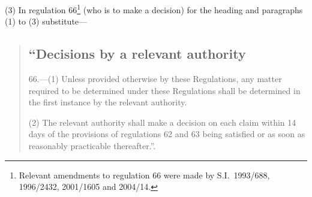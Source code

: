 \documentclass[12pt,a4paper]{article}
\begin{document}
(3) In regulation 66\footnote{Relevant amendments to regulation 66 were made by S.I.\ 1993/688, 1996/2432, 2001/1605 and 2004/14.} (who is to make a decision) for the heading and paragraphs (1) to (3) substitute—
\begin{quotation}
\subsection*{“Decisions by a relevant authority}

66.---(1)  Unless provided otherwise by these Regulations, any matter required to be determined under these Regulations shall be determined in the first instance by the relevant authority.

(2) The relevant authority shall make a decision on each claim within 14 days of the provisions of regulations 62 and 63 being satisfied or as soon as reasonably practicable thereafter.”.
\end{quotation}

\end{document}
